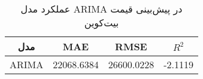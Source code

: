 
        \begin{table}[h]
            \centering
            \begin{tabular}{cccc}
                \toprule
                \textbf{مدل} & \textbf{MAE} & \textbf{RMSE} & \textbf{ \(R^2\) } \\
                \midrule
                ARIMA & 22068.6384 & 26600.0228 & -2.1119 \\
                \bottomrule
            \end{tabular}
            \caption{عملکرد مدل ARIMA در پیش‌بینی قیمت بیت‌کوین}
            \label{tab:arima_performance}
        \end{table}
        
